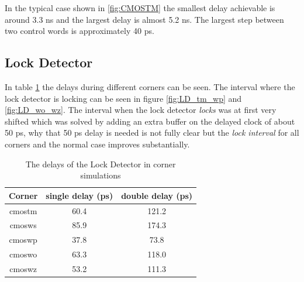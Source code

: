 \documentclass[a4paper,12pt]{article} \usepackage{graphicx}
\begin{document}
In the typical case shown in \ref{fig:CMOSTM} the smallest delay achievable is
around 3.3 ns and the largest delay is almost 5.2 ns. The largest step between
two control words is approximately 40 ps. 

\subsection{Lock Detector}
In table \ref{tab:LD_delays_corner} the delays during different
corners can be seen. The interval where the lock detector is locking
can be seen in figure \ref{fig:LD_tm_wp} and \ref{fig:LD_wo_wz}. The
interval when the lock detector \emph{locks} was at first very shifted
which was solved by adding an extra buffer on the delayed clock of
about 50 ps, why that 50 ps delay is needed is not fully clear but the
\emph{lock interval} for all corners and the normal case improves substantially.
\begin{table}[h]
        \centering
        \begin{tabular}{|c|c|c|}
                \hline
                \textbf{Corner} & \textbf{single delay (ps)} &
                \textbf{double delay (ps)} \\
                \hline
                cmostm & 60.4 & 121.2 \\
                cmosws & 85.9 & 174.3 \\
                cmoswp & 37.8 & 73.8  \\
                cmoswo & 63.3 & 118.0 \\
                cmoswz & 53.2 & 111.3 \\
                \hline
        \end{tabular}
        \caption{The delays of the Lock Detector in corner simulations}
        \label{tab:LD_delays_corner}
\end{table}
\end{document}
